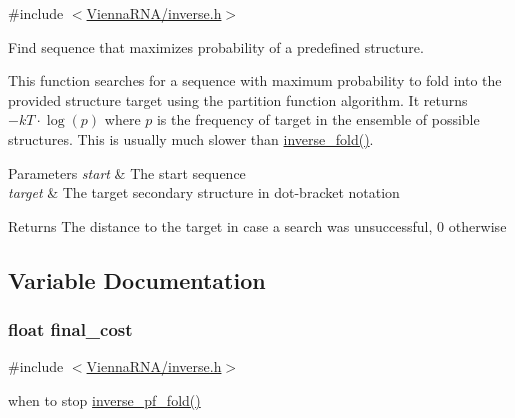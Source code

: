 {\ttfamily \#include $<$\hyperlink{inverse_8h}{Vienna\+R\+N\+A/inverse.\+h}$>$}



Find sequence that maximizes probability of a predefined structure. 

This function searches for a sequence with maximum probability to fold into the provided structure \textquotesingle{}target\textquotesingle{} using the partition function algorithm. It returns $-kT \cdot \log(p)$ where $p$ is the frequency of \textquotesingle{}target\textquotesingle{} in the ensemble of possible structures. This is usually much slower than \hyperlink{group__inverse__fold_ga7af026de55d4babad879f2c92559cbbc}{inverse\+\_\+fold()}.


\begin{DoxyParams}{Parameters}
{\em start} & The start sequence \\
\hline
{\em target} & The target secondary structure in dot-\/bracket notation \\
\hline
\end{DoxyParams}
\begin{DoxyReturn}{Returns}
The distance to the target in case a search was unsuccessful, 0 otherwise 
\end{DoxyReturn}


\subsection{Variable Documentation}
\subsubsection[{\texorpdfstring{final\+\_\+cost}{final_cost}}]{\setlength{\rightskip}{0pt plus 5cm}float final\+\_\+cost}\hypertarget{group__inverse__fold_ga7f17d3b169af048d32bb185039a9c09c}{}\label{group__inverse__fold_ga7f17d3b169af048d32bb185039a9c09c}


{\ttfamily \#include $<$\hyperlink{inverse_8h}{Vienna\+R\+N\+A/inverse.\+h}$>$}

when to stop \hyperlink{group__inverse__fold_gaeef52ecbf2a2450ad585a344f9826806}{inverse\+\_\+pf\+\_\+fold()} 
